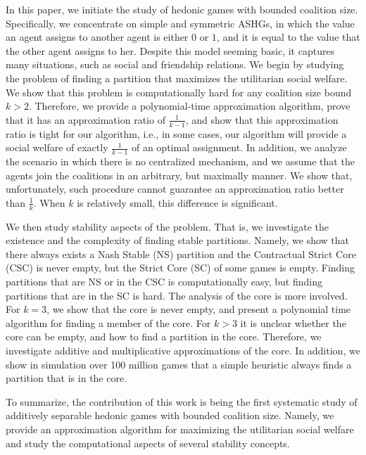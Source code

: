 \documentclass[sigconf,anonymous]{aamas}
\begin{document}
In this paper, we initiate the study of hedonic games with bounded coalition size. Specifically, we concentrate on simple and symmetric ASHGs, in which the value an agent assigns to another agent is either $0$ or $1$, and it is equal to the value that the other agent assigns to her. Despite this model seeming basic, it captures many situations, such as social and friendship relations. We begin by studying the problem of finding a partition that maximizes the utilitarian social welfare. We show that this problem is computationally hard for any coalition size bound $k>2$. Therefore, we provide a polynomial-time approximation algorithm, prove that it has an approximation ratio of $\frac{1}{k-1}$, and show that this approximation ratio is tight for our algorithm, i.e., in some cases, our algorithm will provide a social welfare of exactly $\frac{1}{k-1}$ of an optimal assignment. In addition, we analyze the scenario in which there is no centralized mechanism, %
and we assume that the agents join the coalitions in an arbitrary, but maximally manner. We show that, unfortunately, such procedure cannot guarantee an approximation ratio better than $\frac{1}{k}$. When $k$ is relatively small, this difference is significant. 

We then study stability aspects of the problem. That is, we investigate the existence %
and the complexity of finding stable partitions. Namely, we show that there always exists a Nash Stable (NS) partition and the Contractual Strict Core (CSC) is never empty, but the Strict Core (SC) of some games is empty. %
Finding partitions that are NS or in the CSC is computationally easy, but finding partitions that are in the SC is hard. The analysis of the core is more involved.
For $k=3$, we show that the core is never empty, and present a polynomial time algorithm for finding a member of the core. For $k>3$ %
it is unclear whether the core can be empty, and how to find a partition in the core. Therefore, we investigate additive and multiplicative approximations of the core. In addition, we show in simulation over 100 million games that a simple heuristic always finds a partition that is in the core.


To summarize, the contribution of this work is being the first systematic study of additively separable hedonic games with bounded coalition size. Namely, we provide an approximation algorithm for maximizing the utilitarian social welfare and study the computational aspects of several stability concepts.
\end{document}
